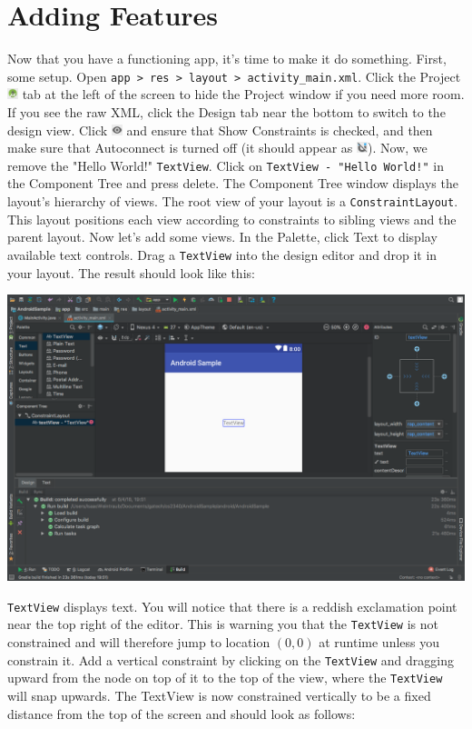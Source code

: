 \documentclass{article}
\begin{document}
\section{Adding Features}
Now that you have a functioning app, it's time to make it do something. First, some setup. Open 
\texttt{app > res > layout > activity\_main.xml}. Click the Project \includegraphics[height=9pt]{images/project.png} tab at the left of the screen to hide the Project window if you need more room. If you see the raw XML, click the Design tab near the bottom to switch to the design view. Click \includegraphics[height=9pt]{images/show.png} and ensure that Show Constraints is checked, and then make sure that Autoconnect is turned off (it should appear as \includegraphics[height=9pt]{images/autoconnect-off.png}). Now, we remove the "Hello World!" \texttt{TextView}. Click on \texttt{TextView - "Hello World!"} in the Component Tree and press delete. The Component Tree window displays the layout's hierarchy of views. The root view of your layout is a \texttt{ConstraintLayout}. This layout positions each view according to constraints to sibling views and the parent layout. Now let's add some views. In the Palette, click Text to display available text controls. Drag a \texttt{TextView} into the design editor and drop it in your layout. The result should look like this:
\begin{center}\includegraphics[width=.5\textwidth]{images/add-textview.png}\end{center}
\texttt{TextView} displays text. You will notice that there is a reddish exclamation point near the top right of the editor. This is warning you that the \texttt{TextView} is not constrained and will therefore jump to location $(0,0)$ at runtime unless you constrain it. Add a vertical constraint by clicking on the \texttt{TextView} and dragging upward from the node on top of it to the top of the view, where the \texttt{TextView} will snap upwards. The TextView is now constrained vertically to be a fixed distance from the top of the screen and should look as follows:
\end{document}

